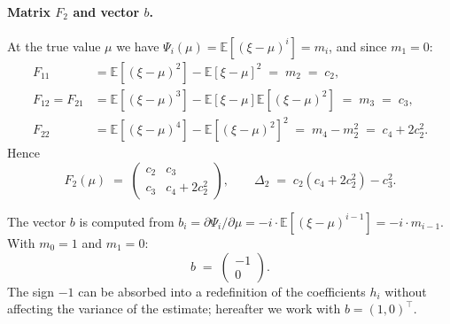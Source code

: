 \documentclass[11pt]{article}
\def\vec#1{#1}%
\def\mathbf#1{#1}%
\theoremstyle{definition}
\newcommand{\E}{\mathbb{E}}
\begin{document}
\paragraph{Matrix $\mathbf{F}_2$ and vector $\vec b$.}
At the true value $\mu$ we have $\Psi_i(\mu) = \E[(\xi - \mu)^i] = m_i$,
and since $m_1 = 0$:
\begin{align}
  F_{11} &= \E[(\xi - \mu)^2] - \E[\xi - \mu]^2
          \;=\; m_2 \;=\; c_2,
          \label{eq:F11-int}\\
  F_{12} = F_{21} &= \E[(\xi - \mu)^3] - \E[\xi - \mu]\E[(\xi - \mu)^2]
          \;=\; m_3 \;=\; c_3,
          \label{eq:F12-int}\\
  F_{22} &= \E[(\xi - \mu)^4] - \E[(\xi - \mu)^2]^2
          \;=\; m_4 - m_2^2
          \;=\; c_4 + 2c_2^2.
          \label{eq:F22-int}
\end{align}
Hence
\begin{equation}\label{eq:F2-matrix}
  \mathbf{F}_2(\mu)
  \;=\;
  \begin{pmatrix}
    c_2 & c_3 \\
    c_3 & c_4 + 2c_2^2
  \end{pmatrix},
  \qquad
  \Delta_2 \;=\; c_2(c_4 + 2c_2^2) - c_3^2.
\end{equation}

The vector $\vec b$ is computed from $b_i = \partial \Psi_i / \partial \mu
= -i \cdot \E[(\xi-\mu)^{i-1}] = -i \cdot m_{i-1}$. With $m_0 = 1$ and
$m_1 = 0$:
\begin{equation}\label{eq:b2-vector}
  \vec b
  \;=\;
  \begin{pmatrix} -1 \\ 0 \end{pmatrix}.
\end{equation}
The sign $-1$ can be absorbed into a redefinition of the coefficients $h_i$
without affecting the variance of the estimate; hereafter we work with
$\vec b = (1, 0)^{\top}$.
\end{document}
